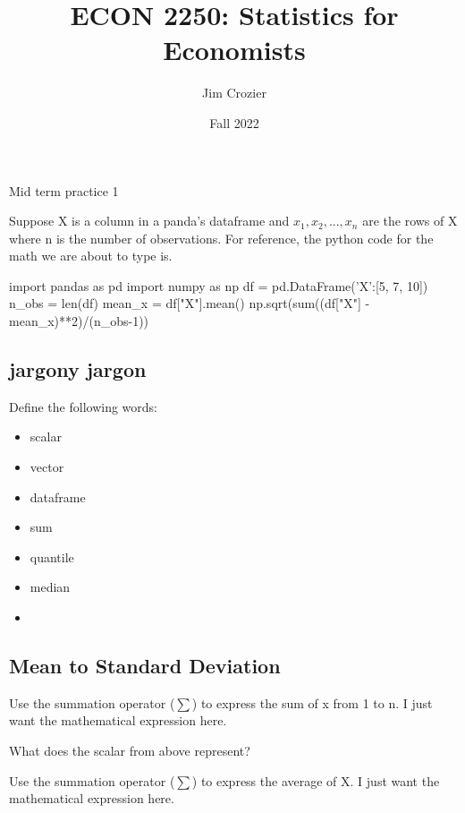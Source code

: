 \documentclass[11pt]{article}
\title{ECON 2250: Statistics for Economists}
\author{Jim Crozier}
\date{Fall 2022}
\newcommand{\blankline}{\quad\pagebreak[2]}
\begin{document}
\maketitle

\blankline

Mid term practice 1

\vspace{10 mm}

Suppose X is a column in a panda's dataframe and $x_1, x_2, ..., x_n$ are the rows of X where n is the number of observations. For reference, the python code for the math we are about to type is.

\begin{python}
import pandas as pd
import numpy as np
df = pd.DataFrame({'X':[5, 7, 10]})
n_obs = len(df)
mean_x = df["X"].mean()
np.sqrt(sum((df["X"] - mean_x)**2)/(n_obs-1))
\end{python}

\subsection{jargony jargon}
Define the following words:

\begin{itemize}
  \item scalar
  \item vector 
  \item dataframe 
  \item sum
  \item quantile
  \item median
  \item 
\end{itemize}


\subsection{ Mean to Standard Deviation }

Use the summation operator ($\sum$) to express the sum of x from 1 to n. I just want the mathematical expression here.
\newline 
\newline
\newline 


 What does the scalar from above represent? 
\newline 
\newline
\newline 

Use the summation operator ($\sum$) to express the average of X. I just want the mathematical expression here.
\newline 
\newline
\newline 
\end{document}

